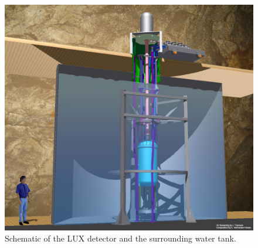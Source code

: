 \begin{figure}[h!]\centering
\includegraphics[scale=0.35]{Chapter_LUX_Det/Davis_3D_tank.jpg}
\caption{Schematic of the LUX detector and the surrounding water tank.}
\label{fig:LUX_Davis}
\end{figure}

